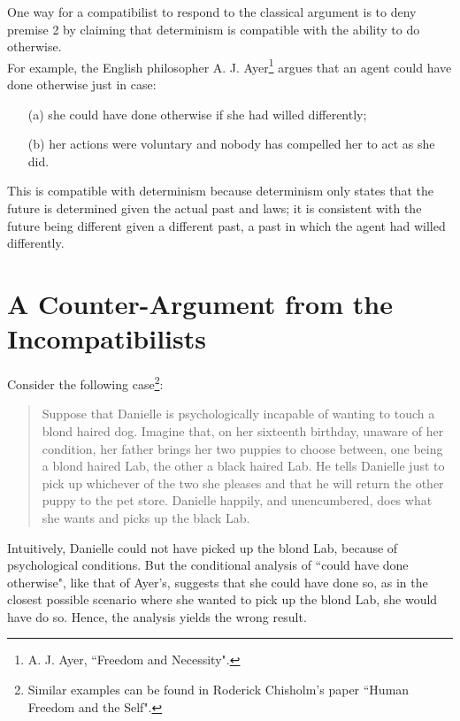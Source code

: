 \documentclass[11pt]{article}
\theoremstyle{definition}
\begin{document}
One way for a compatibilist to respond to the classical argument is to deny premise 2 by claiming that determinism is compatible with the ability to do otherwise. \\

\noindent
For example, the English philosopher A. J. Ayer\footnote{A. J. Ayer, ``Freedom and Necessity".} argues that an agent could have done otherwise just in case:
\begin{enumerate}[\hspace{1cm}]
\item[(a)] she could have done otherwise if she had willed differently;
\item[(b)] her actions were voluntary and nobody has compelled her to act as she did.
\end{enumerate}

This is compatible with determinism because determinism only states that the future is determined given the actual past and laws; it is consistent with the future being different given a different past, a past in which the agent had willed differently.

\section*{A Counter-Argument from the Incompatibilists}

Consider the following case\footnote{Similar examples can be found in Roderick Chisholm's paper ``Human Freedom and the Self".}:

\begin{quote}
Suppose that Danielle is psychologically incapable of wanting to touch a blond haired dog. Imagine that, on her sixteenth birthday, unaware of her condition, her father brings her two puppies to choose between, one being a blond haired Lab, the other a black haired Lab. He tells Danielle just to pick up whichever of the two she pleases and that he will return the other puppy to the pet store. Danielle happily, and unencumbered, does what she wants and picks up the black Lab.
\end{quote}

Intuitively, Danielle could not have picked up the blond Lab, because of psychological conditions. But the conditional analysis of ``could have done otherwise", like that of Ayer's, suggests that she could have done so, as in the closest possible scenario where she wanted to pick up the blond Lab, she would have do so. Hence, the analysis yields the wrong result.
\end{document}
